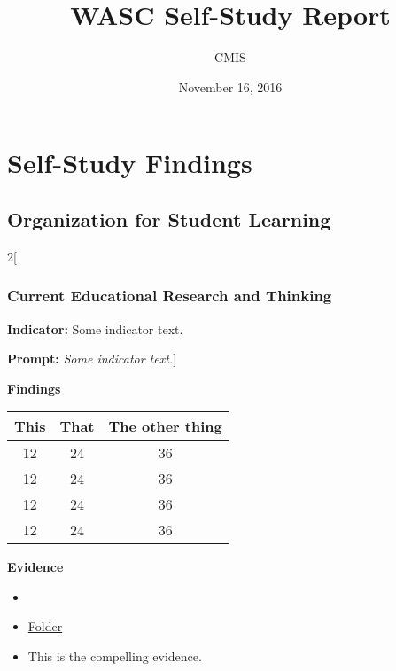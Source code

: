 \documentclass{report}
\title{WASC Self-Study Report}
\date{November 16, 2016}
\author{CMIS}
\begin{document}
\maketitle

\chapter{Self-Study Findings}
\section{Organization for Student Learning}
\blindtext

\blindtext
 
\begin{paracol}{2}[\subsection{Current Educational Research and Thinking}
\noindent\textbf{Indicator:} Some indicator text.

\noindent\textbf{Prompt:} \textit{Some indicator text.}]

\noindent\textbf{Findings}

\blindtext

\begin{table}[!h]
\begin{tabular}{c | c || c}
This & That & The other thing \\
\hline
12   &  24  &  36 \\
12   &  24  &  36 \\
12   &  24  &  36 \\
12   &  24  &  36 \\
\end{tabular}
\end{table}


\blindtext

\switchcolumn
\noindent\textbf{Evidence}
\vspace{-\topsep}

\begin{itemize}[leftmargin=*]
\setlength{\parskip}{0pt}
\setlength{\itemsep}{0pt plus 1pt}
\item \blindtext
\item \href{https://drive.google.com/a/cmis.ac.th/folderview?id=0ByVFfrm0zfolWE0yenprdktGVlk&usp=sharing}{Folder}
\item This is the compelling evidence.
\end{itemize}

\end{paracol}
\end{document}
